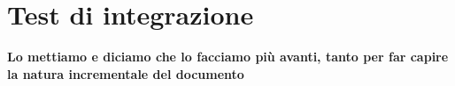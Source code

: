 \section{Test di integrazione}
\textbf{Lo mettiamo e diciamo che lo facciamo più avanti, tanto per far capire la natura incrementale del documento}